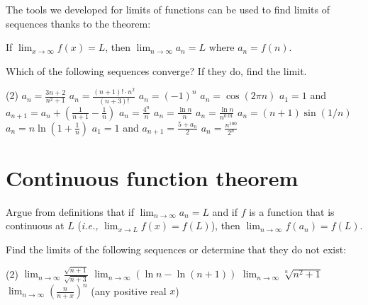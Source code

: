 \documentclass{discussion}
\begin{document}
The tools we developed for limits of functions can be used to find limits of sequences thanks to the theorem:
\begin{center}
    If \(\lim_{x\to \infty} f(x) = L\), then \(\lim_{n\to \infty} a_n = L\) where \(a_n = f(n)\).
\end{center}

\begin{question}
    Which of the following sequences converge? If they do, find the limit.
    \begin{tasks}(2)
        \task \(\displaystyle a_n = \frac{3n + 2}{n^2 + 1}\)
        \task \(\displaystyle a_n = \frac{(n+1)! \cdot n^2}{(n+3)!}\)
        \task \(\displaystyle a_n = (-1)^n\)
        \task \(\displaystyle a_n = \cos(2\pi n)\)
        \task \(a_1 = 1\) and \(\displaystyle a_{n+1} = a_n + \left( \frac{1}{n+1} - \frac{1}{n} \right)\)
        \task \(\displaystyle a_n = \frac{4^n}{n}\)
        \task \(\displaystyle a_n = \frac{\ln n}{n}\)
        \task \(\displaystyle a_n = \frac{\ln n}{n^{0.01}}\)
        \task \(\displaystyle a_n = (n + 1) \sin(1/n)\)
        \task \(\displaystyle a_n = n \ln\left( 1 + \frac{1}{n} \right)\)
        \task \(a_1 = 1\) and \(\displaystyle a_{n+1} = \frac{5 + a_n}{2}\)
        \task \(\displaystyle a_n = \frac{n^{100}}{2^{n}}\)
    \end{tasks}
\end{question}

\section{Continuous function theorem}

\begin{question}
    Argue from definitions that if \(\lim_{n\to \infty} a_n = L\) and if \(f\) is a function that is continuous at \(L\) (\textit{i.e.,} \(\lim_{x\to L} f(x) = f(L)\)), then \(\lim_{n\to \infty} f(a_n) = f(L)\).
\end{question}

\vspace{1.2in}

\begin{question}
    Find the limits of the following sequences or determine that they do not exist:
    \begin{tasks}(2)
        \task \(\displaystyle \lim_{n\to \infty} \frac{\sqrt{n + 1}}{\sqrt{n + 3}}\)
        \task \(\displaystyle \lim_{n\to \infty} (\ln n - \ln (n + 1))\)
        \task \(\displaystyle \lim_{n\to \infty} \sqrt[n]{n^2 + 1}\)
        \task \(\displaystyle \lim_{n\to \infty} \left( \frac{n}{n + x} \right)^n\) (any positive real \(x\))
    \end{tasks}
\end{question}
\end{document}
